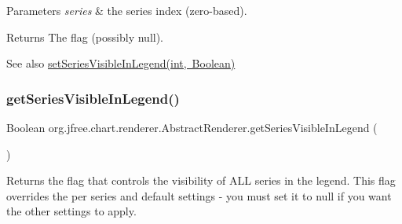 \begin{DoxyParams}{Parameters}
{\em series} & the series index (zero-\/based).\\
\hline
\end{DoxyParams}
\begin{DoxyReturn}{Returns}
The flag (possibly {\ttfamily null}).
\end{DoxyReturn}
\begin{DoxySeeAlso}{See also}
\mbox{\hyperlink{classorg_1_1jfree_1_1chart_1_1renderer_1_1_abstract_renderer_ab2f6f64f253e3e762ceb32274d79d6ad}{set\+Series\+Visible\+In\+Legend(int, Boolean)}} 
\end{DoxySeeAlso}
\mbox{\label{classorg_1_1jfree_1_1chart_1_1renderer_1_1_abstract_renderer_afa4d326cb72c09bce35c28534efd7ec0}} 
\subsubsection{\texorpdfstring{get\+Series\+Visible\+In\+Legend()}{getSeriesVisibleInLegend()}\hspace{0.1cm}{\footnotesize\ttfamily [2/2]}}
{\footnotesize\ttfamily Boolean org.\+jfree.\+chart.\+renderer.\+Abstract\+Renderer.\+get\+Series\+Visible\+In\+Legend (\begin{DoxyParamCaption}{ }\end{DoxyParamCaption})}

Returns the flag that controls the visibility of A\+LL series in the legend. This flag overrides the per series and default settings -\/ you must set it to {\ttfamily null} if you want the other settings to apply.

